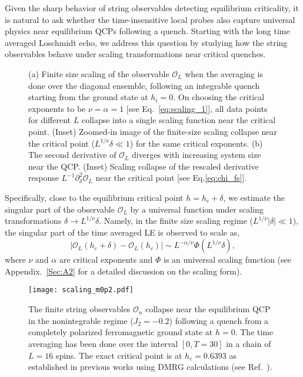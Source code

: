 \documentclass[aps,prx,twocolumn]{revtex4-2}
\begin{document}
Given the sharp behavior of string observables detecting equilibrium criticality, it is natural to ask whether the time-insensitive local probes also capture universal physics near equilibrium QCPs following a quench. Starting with the long time averaged Loschmidt echo, we address this question by studying how the string observables behave under scaling transformations near critical quenches.
\begin{figure}[ht]
		\hspace{0.25cm}

\caption{(a) Finite size scaling of the observable $\mathcal{O}_L$ when the averaging is done over the diagonal ensemble, following an integrable quench starting from the ground state at $h_i=0$. On choosing the critical exponents to be $\nu=\alpha=1$ [see  Eq.~\eqref{eq:scaling_1}], all data points for different $L$ collapse into a single scaling function near the critical point. (Inset) Zoomed-in image of the finite-size scaling collapse near the critical point ($L^{1/\nu}\delta\ll 1$) for the same critical exponents. (b) The second derivative of $\mathcal{O}_L$ diverges with increasing system size near the QCP. (Inset) Scaling collapse of the rescaled derivative response $L^{-1}\partial_{\delta}^2\mathcal{O}_L$ near the critical point [see Eq.\eqref{eq:chi_fs}].}
\end{figure}
 Specifically, close to the equilibrium critical point $h=h_c+\delta$, we estimate the singular part of the observable $\mathcal{O}_L$ by a universal function under scaling transformations $\delta\rightarrow L^{1/\nu}\delta$. Namely, in the finite size scaling regime ($L^{1/\nu}|\delta|\ll 1$), the singular part of the time averaged LE is observed to scale as,
\begin{equation}\label{eq:scaling_1}
|\mathcal{O}_L(h_c+\delta)-\mathcal{O}_L(h_c)|\sim L^{-\alpha/\nu}\Phi(L^{1/\nu}\delta),
\end{equation}
where $\nu$ and $\alpha$ are critical exponents and $\Phi$ is an universal scaling function (see Appendix.~\ref{Sec:A2} for a detailed discussion on the scaling form). 
\begin{figure}[ht]
	\texttt{[image: scaling\_m0p2.pdf]}
	
	\caption{ The finite string observables $\mathcal{O}_n$ collapse near the equilibrium QCP in the nonintegrable  {regime} ($J_2=-0.2$) following a quench from a completely polarized ferromagnetic ground state at $h=0$. The time averaging has been done  {over the interval $[0,T=30]$} in a chain of $L=16$ spins. The exact critical point is at $h_c=0.6393$ as established in previous works using DMRG calculations (see Ref.~\cite{matteo06}).}
\label{fig:6}
\end{figure}
\end{document}
